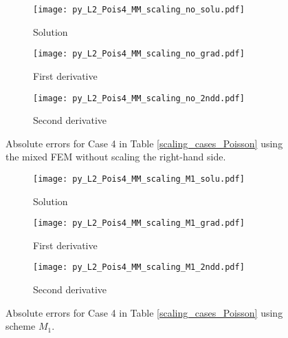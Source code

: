 \documentclass[review,3p]{elsarticle}
\begin{document}
\begin{figure}[!ht]
    \begin{subfigure}{5.5cm}
        \texttt{[image: py\_L2\_Pois4\_MM\_scaling\_no\_solu.pdf]}
        \caption{Solution}
        \label{py_L2_Pois4_MM_scaling_no_solu}
    \end{subfigure}
    \hspace{-0.2cm}
    \begin{subfigure}{5.5cm}
        \texttt{[image: py\_L2\_Pois4\_MM\_scaling\_no\_grad.pdf]}
        \caption{First derivative}
        \label{py_L2_Pois4_MM_scaling_no_grad}
    \end{subfigure}
    \hspace{-0.2cm}
    \begin{subfigure}{5.5cm}
        \texttt{[image: py\_L2\_Pois4\_MM\_scaling\_no\_2ndd.pdf]}
        \caption{Second derivative}
        \label{py_L2_Pois4_MM_scaling_no_2ndd}
    \end{subfigure}
\caption{Absolute errors for Case 4 in Table \ref{scaling_cases_Poisson} using the mixed FEM without scaling the right-hand side.}
\label{py_L2_Pois4_MM_scaling_no}
\end{figure}

\begin{figure}[!ht]
    \begin{subfigure}{5.5cm}
        \texttt{[image: py\_L2\_Pois4\_MM\_scaling\_M1\_solu.pdf]}
        \caption{Solution}
        \label{py_L2_Pois4_MM_scaling_M1_solu}
    \end{subfigure}
    \hspace{-0.2cm}
    \begin{subfigure}{5.5cm}
        \texttt{[image: py\_L2\_Pois4\_MM\_scaling\_M1\_grad.pdf]}
        \caption{First derivative}
        \label{py_L2_Pois4_MM_scaling_M1_grad}
    \end{subfigure}
    \hspace{-0.2cm}
    \begin{subfigure}{5.5cm}
        \texttt{[image: py\_L2\_Pois4\_MM\_scaling\_M1\_2ndd.pdf]}
        \caption{Second derivative}
        \label{py_L2_Pois4_MM_scaling_M1_2ndd}
    \end{subfigure}
\caption{Absolute errors for Case 4 in Table \ref{scaling_cases_Poisson} using scheme $M_1$.}
\label{py_L2_Pois4_MM_scaling_M1}
\end{figure}
\end{document}
